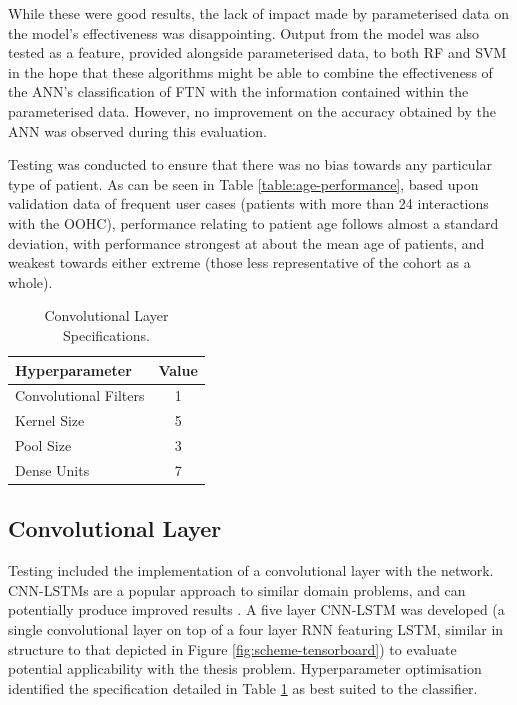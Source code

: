 While these were good results, the lack of impact made by parameterised data on the model's effectiveness was disappointing. Output from the model was also tested as a feature, provided alongside parameterised data, to both RF and SVM in the hope that these algorithms might be able to combine the effectiveness of the ANN's classification of FTN with the information contained within the parameterised data. However, no improvement on the accuracy obtained by the ANN was observed during this evaluation. 


Testing was conducted to ensure that there was no bias towards any particular type of patient. As can be seen in Table \ref{table:age-performance}, based upon validation data of frequent user cases (patients with more than 24 interactions with the OOHC), performance relating to patient age follows almost a standard deviation, with performance strongest at about the mean age of patients, and weakest towards either extreme (those less representative of the cohort as a whole).   

\begin{table}[ht]
\caption{Convolutional Layer Specifications.}
\setlength{\tabcolsep}{9pt}
\centering
\begin{tabular}{@{}lc@{}}
\toprule
     \textbf{Hyperparameter}               & \textbf{Value} \\ \midrule

Convolutional Filters           & 1              \\
Kernel Size      & 5              \\
Pool Size             & 3              \\
Dense Units            & 7                                               \\ \bottomrule
\end{tabular}%

\label{table:cnn-lstm-hyperparameters}
\end{table}



\subsection{Convolutional Layer}



Testing included the implementation of a convolutional layer with the network. CNN-LSTMs are a popular approach to similar domain problems, and can potentially produce improved results \cite{swapna2018automated,shahzadi2018cnn,
li2020hybrid}. A five layer CNN-LSTM was developed (a single convolutional layer on top of a four layer RNN featuring LSTM, similar in structure to that depicted in Figure \ref{fig:scheme-tensorboard}) to evaluate potential applicability with the thesis problem. Hyperparameter optimisation identified the specification detailed in Table \ref{table:cnn-lstm-hyperparameters} as best suited to the classifier.

